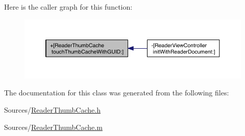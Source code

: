 Here is the caller graph for this function\-:
\nopagebreak
\begin{figure}[H]
\begin{center}
\leavevmode
\includegraphics[width=350pt]{da/d97/interface_reader_thumb_cache_aa3c0deaeeed2095eba99fb8adae05acf_icgraph}
\end{center}
\end{figure}




The documentation for this class was generated from the following files\-:\begin{DoxyCompactItemize}
\item 
Sources/\hyperlink{_reader_thumb_cache_8h}{Reader\-Thumb\-Cache.\-h}\item 
Sources/\hyperlink{_reader_thumb_cache_8m}{Reader\-Thumb\-Cache.\-m}\end{DoxyCompactItemize}
